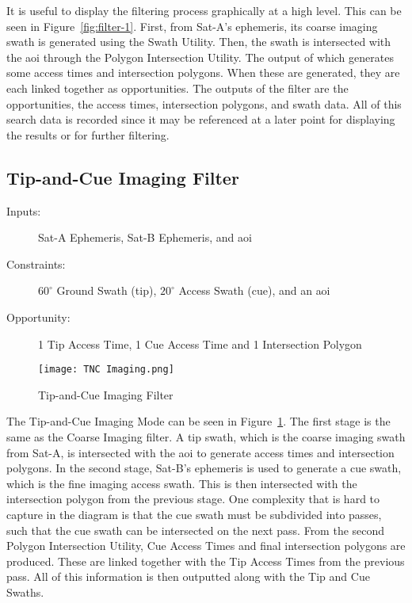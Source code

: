 It is useful to display the filtering process graphically at a high level.
This can be seen in Figure~\ref{fig:filter-1}. First, from Sat-A's ephemeris,
its coarse imaging swath is generated using the Swath Utility. Then, the swath
is intersected with the \gls{aoi} through the Polygon Intersection Utility. The
output of which generates some access times and intersection polygons. When
these are generated, they are each linked together as opportunities. The
outputs of the filter are the opportunities, the access times, intersection
polygons, and swath data. All of this search data is recorded since it may be
referenced at a later point for displaying the results or for further
filtering.

\subsection{Tip-and-Cue Imaging Filter}

\begin{description} 

    \item[Inputs:]  Sat-A Ephemeris, Sat-B Ephemeris, and  \gls{aoi}

    \item[Constraints:] $60^\circ$ Ground Swath (tip), $20^\circ$ Access Swath (cue), and an \gls{aoi}

    \item[Opportunity:] 1 Tip Access Time, 1 Cue Access Time and 1 Intersection Polygon

\end{description} 

\begin{figure}[h]
    \centering
    \texttt{[image: TNC Imaging.png]} 
    \caption{Tip-and-Cue Imaging Filter}
    \label{fig:filter-2} 
\end{figure}


The Tip-and-Cue Imaging Mode can be seen in Figure~\ref{fig:filter-2}. The
first stage is the same as the Coarse Imaging filter. A tip swath, which is the
coarse imaging swath from Sat-A, is intersected with the \gls{aoi} to generate
access times and intersection polygons. In the second stage, Sat-B's ephemeris
is used to generate a cue swath, which is the fine imaging access swath. This
is then intersected with the intersection polygon from the previous stage. One
complexity that is hard to capture in the diagram is that the cue swath must be
subdivided into passes, such that the cue swath can be intersected on the next
pass. From the second Polygon Intersection Utility, Cue Access Times and final
intersection polygons are produced. These are linked together with the Tip
Access Times from the previous pass. All of this information is then outputted
along with the Tip and Cue Swaths.

